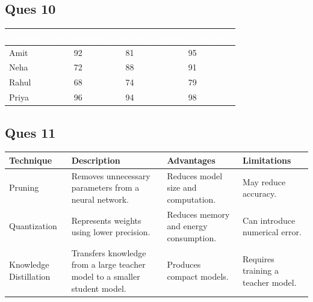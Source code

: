 \documentclass{article}
\begin{document}
\subsection{\textbf{Ques 10}}
\begin{table}[h]
\centering
\begin{tabular}{|l|c|c|c|}
\hline
\rowcolor{blue!60}
\textcolor{white}{\textbf{Student}} & \textcolor{white}{\textbf{Mathematics}} &
\textcolor{white}{\textbf{Physics}} & \textcolor{white}{\textbf{Computer Science}} \\
\hline

Amit &
\cellcolor{green!25}92 & \cellcolor{yellow!30}81 & \cellcolor{green!25}95 \\
\hline

Neha &
\cellcolor{red!25}72 & \cellcolor{yellow!30}88 & \cellcolor{green!25}91\\
\hline

Rahul &
\cellcolor{red!25}68 & \cellcolor{red!25}74 & \cellcolor{yellow!30}79 \\
\hline

Priya &
\cellcolor{green!25}96 & \cellcolor{green!25}94 & \cellcolor{green!25}98 \\
\hline

\end{tabular}
\end{table}

\subsection{\textbf{Ques 11}}
\begin{table}[h]
\centering
\begin{tabular}{|p{2cm}|p{4cm}|p{3.5cm}|p{3.5cm}|}
\hline
\textbf{Technique} & \textbf{Description} & \textbf{Advantages} & \textbf{Limitations} \\
\hline
Pruning & Removes unnecessary parameters from a neural network. & Reduces model size and computation. & May reduce accuracy. \\
\hline
Quantization & Represents weights using lower precision. & Reduces memory and energy consumption. & Can introduce numerical error. \\
\hline
Knowledge Distillation & Transfers knowledge from a large teacher model to a smaller student model. & Produces compact models. 
& Requires training a teacher model. \\
\hline

\end{tabular}
\end{table}
\end{document}
